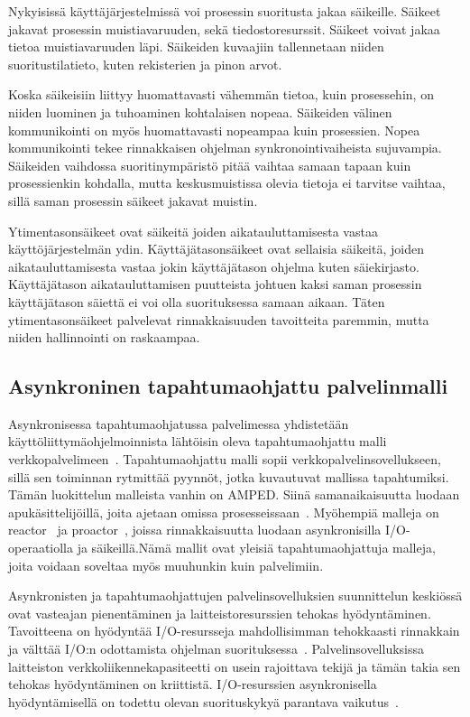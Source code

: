 \documentclass[12pt]{article}
\begin{document}
Nykyisissä käyttäjärjestelmissä voi prosessin suoritusta jakaa
säikeille. Säikeet jakavat prosessin muistiavaruuden, sekä tiedostoresurssit.
Säikeet voivat jakaa tietoa muistiavaruuden läpi. Säikeiden kuvaajiin
tallennetaan niiden suoritustilatieto, kuten rekisterien ja pinon arvot.

Koska säikeisiin liittyy huomattavasti vähemmän tietoa, kuin prosessehin,
on niiden luominen ja tuhoaminen kohtalaisen nopeaa. Säikeiden välinen
kommunikointi on myös huomattavasti nopeampaa kuin prosessien. Nopea
kommunikointi tekee rinnakkaisen ohjelman synkronointivaiheista
sujuvampia. Säikeiden vaihdossa suoritinympäristö pitää vaihtaa 
samaan tapaan kuin prosessienkin kohdalla, mutta keskusmuistissa olevia
tietoja ei tarvitse vaihtaa, sillä saman prosessin säikeet jakavat
muistin.

Ytimentasonsäikeet ovat säikeitä joiden aikatauluttamisesta vastaa
käyttöjärjestelmän ydin. Käyttäjätasonsäikeet ovat sellaisia säikeitä,
joiden aikatauluttamisesta vastaa jokin käyttäjätason ohjelma kuten
säiekirjasto. Käyttäjätason aikatauluttamisen puutteista johtuen
kaksi saman prosessin käyttäjätason säiettä ei voi olla suorituksessa
samaan aikaan. Täten ytimentasonsäikeet palvelevat rinnakkaisuuden tavoitteita
paremmin, mutta niiden hallinnointi on raskaampaa.
\subsection{Asynkroninen tapahtumaohjattu palvelinmalli}

Asynkronisessa tapahtumaohjatussa palvelimessa yhdistetään
käyttöliittymäohjelmoinnista lähtöisin oleva tapahtumaohjattu malli
verkkopalvelimeen~\cite{pai_flash:1999}. Tapahtumaohjattu malli sopii verkkopalvelinsovellukseen,
sillä sen toiminnan rytmittää pyynnöt, jotka
kuvautuvat mallissa tapahtumiksi.
Tämän luokittelun malleista vanhin on AMPED. Siinä
samanaikaisuutta luodaan apukäsittelijöillä, joita
ajetaan omissa prosesseissaan~\cite{pai_flash:_1999}.
Myöhempiä malleja on reactor~\cite{schmidt_reactor:_1995}
ja proactor~\cite{hu_applying_1998}, joissa
rinnakkaisuutta luodaan asynkronisilla I/O-operaatiolla
ja säikeillä.Nämä mallit ovat yleisiä tapahtumaohjattuja malleja,
joita voidaan soveltaa myös muuhunkin kuin palvelimiin.

Asynkronisten ja tapahtumaohjattujen palvelinsovelluksien suunnittelun keskiössä
ovat vasteajan pienentäminen ja laitteistoresurssien tehokas hyödyntäminen.
Tavoitteena on hyödyntää I/O-resursseja mahdollisimman tehokkaasti
rinnakkain ja välttää I/O:n odottamista ohjelman suorituksessa~\cite{pai_flash:_1999}.
Palvelinsovelluksissa
laitteiston verkkoliikennekapasiteetti on usein rajoittava tekijä ja tämän takia
sen tehokas hyödyntäminen on kriittistä. I/O-resurssien asynkronisella hyödyntämisellä on todettu
olevan suorituskykyä parantava vaikutus~\cite{hu_applying_1998}.
\end{document}
